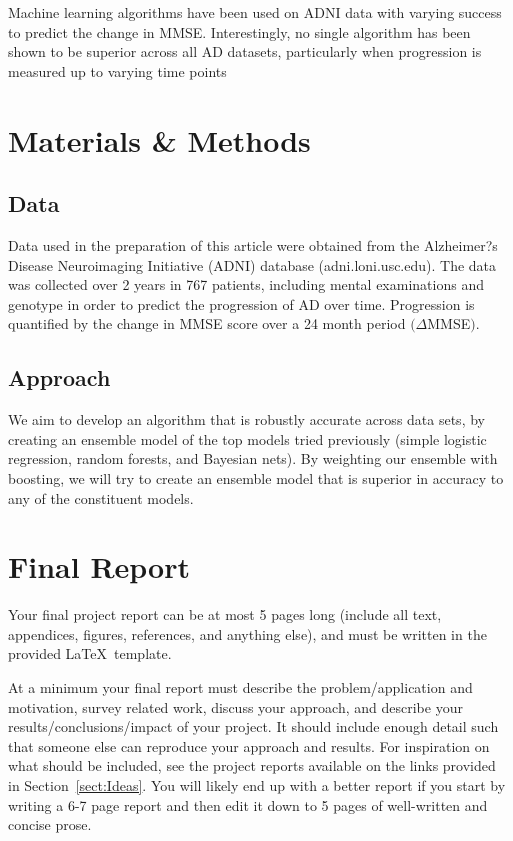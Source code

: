 \documentclass{article}
\begin{document}
Machine learning algorithms have been used on ADNI data with varying success to predict the change in MMSE. Interestingly, no single algorithm has been shown to be superior across all AD datasets, particularly when progression is measured up to varying time points \cite{umer11}

\section{Materials \& Methods}
\subsection{Data} Data used in the preparation of this article were obtained from the Alzheimer?s Disease Neuroimaging Initiative (ADNI) database (adni.loni.usc.edu). The data was collected over 2 years in 767 patients, including mental examinations and genotype in order to predict the progression of AD over time. Progression is quantified by the change in MMSE score over a 24 month period $(\Delta$MMSE$)$.

\subsection{Approach} We aim to develop an algorithm that is robustly accurate across data sets, by creating an ensemble model of the top models tried previously (simple logistic regression, random forests, and Bayesian nets). By weighting our ensemble with boosting, we will try to create an ensemble model that is superior in accuracy to any of the constituent models.

\section{Final Report}

Your final project report can be at most 5 pages long (include all text, appendices, figures, references, and anything else), and must be written in the provided \LaTeX\ template. 

At a minimum your final report must describe the problem/application and motivation, survey related work, discuss your approach, and describe your results/conclusions/impact of your project.  It should include enough detail such that someone else can reproduce your approach and results.  For inspiration on what should be included, see the project reports available on the links provided in Section~\ref{sect:Ideas}.  You will likely end up with a better report if you start by writing a 6-7 page report and then edit it down to 5 pages of well-written and concise prose.
\end{document}
